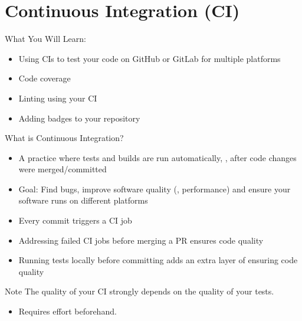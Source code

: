 \section{Continuous Integration (CI)}

\begin{frame}[fragile]{What You Will Learn:}
  \begin{itemize}
    \item Using CIs to test your code on GitHub or GitLab for multiple platforms
    \item Code coverage
    \item Linting using your CI
    \item Adding badges to your repository
  \end{itemize}
\end{frame}


\begin{frame}[fragile]{What is Continuous Integration?}
  \begin{itemize}
    \setlength{\itemsep}{1em}
    \item A practice where tests and builds are run automatically, \eg, after code changes were
      merged/committed
    \item Goal: Find bugs, improve software quality (\eg, performance) and ensure
      your software runs on different platforms
    \item Every commit triggers a CI job
    \item Addressing failed CI jobs before merging a PR ensures code quality
    \item Running tests locally before committing adds an extra layer of ensuring code quality
  \end{itemize}
  \begin{block}{Note}
     The quality of your CI strongly depends on the quality of your tests.
     \begin{itemize}
      \item Requires effort beforehand.
     \end{itemize}
  \end{block}
\end{frame}

